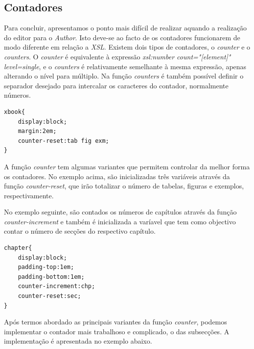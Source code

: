 \documentclass[a4paper]{article}
\begin{document}
\subsection{Contadores}

\hspace{1cm}Para concluir, apresentamos o ponto mais difícil de realizar aquando a realização do editor para o \emph{Author}. Isto deve-se ao facto de os contadores funcionarem de modo diferente em relação a \emph{XSL}. Existem dois tipos de contadores, o \emph{counter} e o \emph{counters}. O \emph{counter} é equivalente à expressão \emph{xsl:number count="[element]" level=single}, e o \emph{counters} é relativamente semelhante à mesma expressão, apenas alterando o nível para múltiplo. Na função \emph{counters} é também possível definir o separador desejado para intercalar os caracteres do contador, normalmente números.\\

\begin{small}
\begin{lstlisting}
xbook{
    display:block;
    margin:2em;
    counter-reset:tab fig exm;
}
\end{lstlisting}
\end{small}

A função \emph{counter} tem algumas variantes que permitem controlar da melhor forma os contadores. No exemplo acima, são inicializadas três variáveis através da função \emph{counter-reset}, que irão totalizar o número de tabelas, figuras e exemplos, respectivamente.

\hspace{1cm}No exemplo seguinte, são contados os números de capítulos através da função \emph{counter-increment} e também é inicializada a varíavel que tem como objectivo contar o número de secções do respectivo capítulo.\\

\begin{small}
\begin{lstlisting}
chapter{
    display:block;
    padding-top:1em;
    padding-bottom:1em;
    counter-increment:chp;
    counter-reset:sec;
}
\end{lstlisting}
\end{small}

\hspace{1cm}Após termos abordado as principais variantes da função \emph{counter}, podemos implementar o contador mais trabalhoso e complicado, o das subsecções. A implementação é apresentada no exemplo abaixo.
\end{document}
